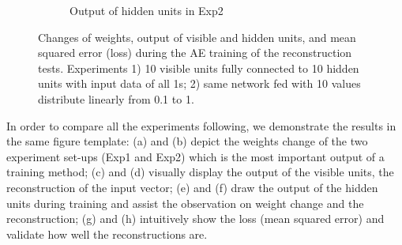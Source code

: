 \begin{figure}
\begin{subfigure}[t]{0.45\textwidth}
		\caption{Output of hidden units in Exp2}
	\end{subfigure}
	\caption{Changes of weights, output of visible and hidden units, and mean squared error (loss) during the AE training of the reconstruction tests. 
		Experiments 1) 10 visible units fully connected to 10 hidden units with input data of all 1s; 2) same network fed with 10 values distribute linearly from 0.1 to 1.}
	\label{fig:ae_orig}
\end{figure}

In order to compare all the experiments following, we demonstrate the results in the same figure template:
(a) and (b) depict the weights change of the two experiment set-ups (Exp1 and Exp2) which is the most important output of a training method;
(c) and (d) visually display the output of the visible units, the reconstruction of the input vector;
(e) and (f) draw the output of the hidden units during training and assist the observation on weight change and the reconstruction;
(g) and (h) intuitively show the loss (mean squared error) and validate how well the reconstructions are.


